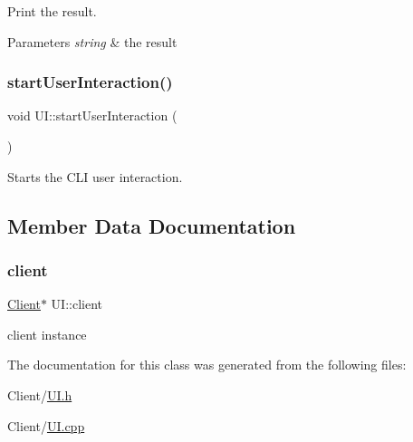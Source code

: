 Print the result. 
\begin{DoxyParams}{Parameters}
{\em string} & the result \\
\hline
\end{DoxyParams}
\mbox{\label{classUI_a018066cc2c5b54cbd51b1a89a29a1c67}} 
\subsubsection{\texorpdfstring{start\+User\+Interaction()}{startUserInteraction()}}
{\footnotesize\ttfamily void U\+I\+::start\+User\+Interaction (\begin{DoxyParamCaption}{ }\end{DoxyParamCaption})}

Starts the C\+LI user interaction. 

\subsection{Member Data Documentation}
\mbox{\label{classUI_a7bd176ddf21a242e884c010b4dcf756f}} 
\subsubsection{\texorpdfstring{client}{client}}
{\footnotesize\ttfamily \mbox{\hyperlink{classClient}{Client}}$\ast$ U\+I\+::client\hspace{0.3cm}{\ttfamily [private]}}

client instance 

The documentation for this class was generated from the following files\+:\begin{DoxyCompactItemize}
\item 
Client/\mbox{\hyperlink{UI_8h}{U\+I.\+h}}\item 
Client/\mbox{\hyperlink{UI_8cpp}{U\+I.\+cpp}}\end{DoxyCompactItemize}
